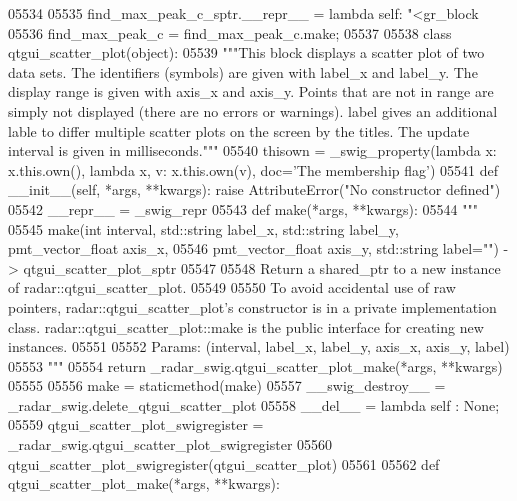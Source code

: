 \begin{DoxyCode}
{{{{{{{{{{{{{{{{{{05534 
05535 find\_max\_peak\_c\_sptr.\_\_repr\_\_ = \textcolor{keyword}{lambda} self: \textcolor{stringliteral}{"<gr\_block %
05536 find\_max\_peak\_c = find\_max\_peak\_c.make;
05537 
05538 \textcolor{keyword}{class }qtgui_scatter_plot(object):
05539     \textcolor{stringliteral}{"""This block displays a scatter plot of two data sets. The identifiers (symbols) are given with
       label\_x and label\_y. The display range is given with axis\_x and axis\_y. Points that are not in range are simply
       not displayed (there are no errors or warnings). label gives an additional lable to differ multiple scatter
       plots on the screen by the titles. The update interval is given in milliseconds."""}
05540     thisown = _swig_property(\textcolor{keyword}{lambda} x: x.this.own(), \textcolor{keyword}{lambda} x, v: x.this.own(v), doc=\textcolor{stringliteral}{'The membership flag'})
05541     \textcolor{keyword}{def }__init__(self, *args, **kwargs): \textcolor{keywordflow}{raise} AttributeError(\textcolor{stringliteral}{"No constructor defined"})
05542     \_\_repr\_\_ = \_swig\_repr
05543     \textcolor{keyword}{def }make(*args, **kwargs):
05544         \textcolor{stringliteral}{"""}
05545 \textcolor{stringliteral}{        make(int interval, std::string label\_x, std::string label\_y, pmt\_vector\_float axis\_x, }
05546 \textcolor{stringliteral}{            pmt\_vector\_float axis\_y, std::string label="") -> qtgui\_scatter\_plot\_sptr}
05547 \textcolor{stringliteral}{}
05548 \textcolor{stringliteral}{        Return a shared\_ptr to a new instance of radar::qtgui\_scatter\_plot.}
05549 \textcolor{stringliteral}{}
05550 \textcolor{stringliteral}{        To avoid accidental use of raw pointers, radar::qtgui\_scatter\_plot's constructor is in a private
       implementation class. radar::qtgui\_scatter\_plot::make is the public interface for creating new instances.}
05551 \textcolor{stringliteral}{}
05552 \textcolor{stringliteral}{        Params: (interval, label\_x, label\_y, axis\_x, axis\_y, label)}
05553 \textcolor{stringliteral}{        """}
05554         \textcolor{keywordflow}{return} \_radar\_swig.qtgui\_scatter\_plot\_make(*args, **kwargs)
05555 
05556     make = staticmethod(make)
05557     \_\_swig\_destroy\_\_ = \_radar\_swig.delete\_qtgui\_scatter\_plot
05558     \_\_del\_\_ = \textcolor{keyword}{lambda} self : \textcolor{keywordtype}{None};
05559 qtgui\_scatter\_plot\_swigregister = \_radar\_swig.qtgui\_scatter\_plot\_swigregister
05560 qtgui_scatter_plot_swigregister(qtgui\_scatter\_plot)
05561 
05562 \textcolor{keyword}{def }qtgui_scatter_plot_make(*args, **kwargs):
}}}}}}}}}}}}}}}}}}}
\end{DoxyCode}

